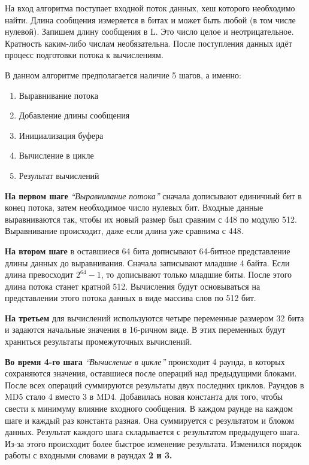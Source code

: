 \documentclass[a4paper,14pt]{report}
\begin{document}
На вход алгоритма поступает входной поток данных, хеш которого необходимо найти. Длина сообщения измеряется в битах и может быть любой (в том числе нулевой). Запишем длину сообщения в L. Это число целое и неотрицательное. Кратность каким-либо числам необязательна. После поступления данных идёт процесс подготовки потока к вычислениям.

\hfill \break

 В данном алгоритме предполагается наличие 5 шагов, а именно:
\begin{enumerate}
  \item Выравнивание потока
  \item Добавление длины сообщения
  \item Инициализация буфера
  \item Вычисление в цикле
  \item Результат вычислений
 \end{enumerate}
 
 \textbf{На первом шаге} \textit{“Выравнивание потока”} сначала дописывают единичный бит в конец потока, затем необходимое число нулевых бит. Входные данные выравниваются так, чтобы их новый размер был сравним с 448 по модулю 512. Выравнивание происходит, даже если длина уже сравнима с 448.
 
 \textbf{На втором шаге} в оставшиеся 64 бита дописывают 64-битное представление длины данных до выравнивания. Сначала записывают младшие 4 байта. Если длина превосходит $2^{64}-1$, то дописывают только младшие биты. После этого длина потока станет кратной 512. Вычисления будут основываться на представлении этого потока данных в виде массива слов по 512 бит.
 
\textbf{На третьем} для вычислений используются четыре переменные размером 32 бита и задаются начальные значения в 16-ричном виде. В этих переменных будут храниться результаты промежуточных вычислений.

\textbf{Во время 4-го шага} \textit{“Вычисление в цикле”} происходит 4 раунда, в которых сохраняются значения, оставшиеся после операций над предыдущими блоками. После всех операций суммируются результаты двух последних циклов. Раундов в MD5 стало 4 вместо 3 в MD4. Добавилась новая константа для того, чтобы свести к минимуму влияние входного сообщения. В каждом раунде на каждом шаге и каждый раз константа разная. Она суммируется с результатом и блоком данных. Результат каждого шага складывается с результатом предыдущего шага. Из-за этого происходит более быстрое изменение результата. Изменился порядок работы с входными словами в раундах \textbf{2 и 3.}
\end{document}
